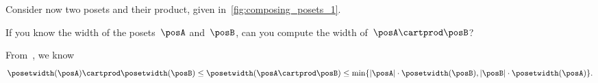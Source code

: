 \begin{example}
    Consider now two posets and their product, given in~\cref{fig:composing_posets_1}.
    \begin{figure*}[h!]
        \centering
        \caption{Product of two posets.}
        \label{fig:composing_posets_1}
    \end{figure*}
\end{example}


\begin{exercise}
    \label{ex:width}
    If you know the width of the posets~$\posA$ and~$\posB$, can you compute the width of~$\posA\cartprod\posB$?
\end{exercise}
\begin{solution}
    From~\cite{bezrukovantichains}, we know
    \begin{equation*}
        \posetwidth(\posA)\cartprod \posetwidth(\posB)\leq \posetwidth(\posA\cartprod \posB)\leq \min \{ \vert \posA\vert \cdot \posetwidth(\posB),\vert \posB \vert \cdot \posetwidth(\posA)\}.
    \end{equation*}
\end{solution}

